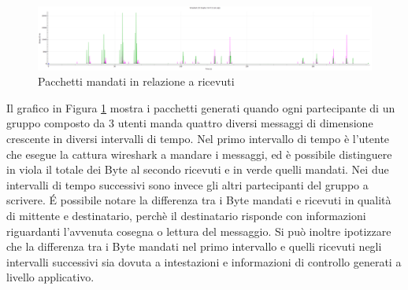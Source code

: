 \documentclass{article}
\begin{document}
\begin{figure}[h]
  \centering
  \includegraphics[width=1\textwidth]{PacchettiMandVsRic.png}
  \caption{Pacchetti mandati in relazione a ricevuti}\label{MandVsRic}
  \end{figure}

  Il grafico in Figura \ref{MandVsRic} mostra i pacchetti generati quando ogni partecipante di un gruppo composto da 3 utenti manda
  quattro diversi messaggi di dimensione crescente in diversi intervalli di tempo. Nel primo intervallo di tempo è l'utente che esegue 
  la cattura wireshark a mandare i messaggi, ed è possibile distinguere in viola il totale dei Byte al secondo ricevuti e in verde quelli 
  mandati. Nei due intervalli di tempo successivi sono invece gli altri partecipanti del gruppo a scrivere.
  \'E possibile notare la differenza tra i Byte mandati e ricevuti in qualità di mittente e destinatario, perchè il destinatario risponde 
  con informazioni riguardanti l'avvenuta cosegna o lettura del messaggio. Si può inoltre ipotizzare che la differenza 
  tra i Byte mandati nel primo intervallo e quelli ricevuti negli intervalli successivi sia dovuta a intestazioni e informazioni di controllo generati a
  livello applicativo.



\pagebreak
\end{document}
